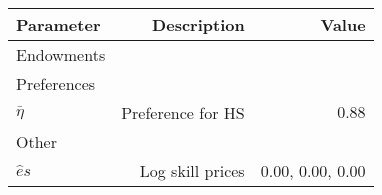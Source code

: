\begin{tabular}{lrr}
\hline
Parameter & Description  & Value  \\ 
\hline
Endowments &   &   \\ 
Preferences &   &   \\ 
$\bar{\eta}$ & Preference for HS  & $0.88$  \\ 
Other &   &   \\ 
$\hat{e}{s}$ & Log skill prices  & 0.00, 0.00, 0.00  \\ 
\hline
\end{tabular}%
